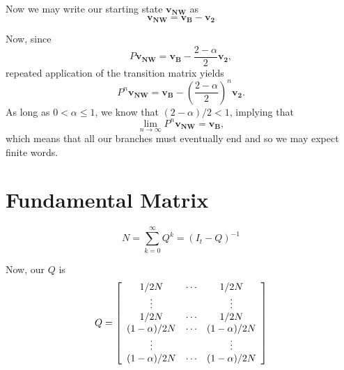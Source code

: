 \documentclass[11pt]{article}
\begin{document}
Now we may write our starting state $\mathbf{v_{NW}}$ as 
\begin{equation}
\mathbf{v_{NW}} = \mathbf{v_B} - \mathbf{v_2}
\end{equation}

Now, since
\begin{equation}
P\mathbf{v_{NW}} = \mathbf{v_B} -  \frac{2-\alpha}{2}\mathbf{v_2},
\end{equation}
repeated application of the transition matrix yields
\begin{equation}
P^n\mathbf{v_{NW}} = \mathbf{v_B} -  \left(\frac{2-\alpha}{2}\right)^n\mathbf{v_2}.
\end{equation}
As long as $0<\alpha\le1$, we know that $(2-\alpha)/2<1$, implying that
\begin{equation}
\lim_{n\to\infty}P^n\mathbf{v_{NW}} = \mathbf{v_B},
\end{equation}
which means that all our branches must eventually end and so we may expect finite words.


\section{Fundamental Matrix}
\begin{equation}
N = \sum_{k=0}^\infty Q^k = (I_t - Q)^{-1}
\end{equation}

Now, our $Q$ is
\begin{equation}
Q = \left[\begin{array}{c c c}
1/2N& \cdots& 1/2N\\
\vdots & &\vdots\\
1/2N& \cdots& 1/2N\\
(1-\alpha)/2N& \cdots& (1-\alpha)/2N\\
\vdots & &\vdots\\
(1-\alpha)/2N& \cdots& (1-\alpha)/2N
\end{array}\right]
\end{equation}




\appendix
\end{document}
